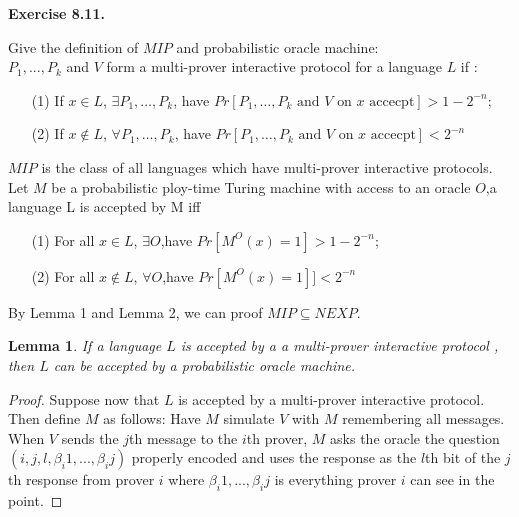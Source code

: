 \documentclass[a4paper]{article}
\newtheorem{lemma}{Lemma}
\newenvironment{exercise}[1]{
	\par
	\noindent\textbf{Exercise #1.}\quad
}{
	\par
	\bigskip
}
\begin{document}

    \begin{exercise}{8.11}
		Give the definition of $MIP$ and probabilistic oracle machine:\\
		
		$P_1,...,P_k$ and $V$ form a multi-prover interactive protocol for a language $L$ if :

		\begin{enumerate}
			\item[(1)] If $x\in L$, $\exists P_1,\ldots,P_k$, have $Pr[\text{$P_1,\ldots,P_k$ and $V$ on $x$ accecpt}]>1-2^{-n}$;
			\item[(2)] If $x\notin L$, $\forall P_1,\ldots,P_k$, have $Pr[\text{$P_1,\ldots,P_k$ and $V$ on $x$ accecpt}]<2^{-n}$
		\end{enumerate}
		
		$MIP$ is the class of all languages which have multi-prover interactive protocols.\\
		
		Let $M$ be a probabilistic ploy-time Turing machine with access to an oracle $O$,a language L is accepted by M iff 

		\begin{enumerate}
			\item[(1)] For all $x\in L$, $\exists O$,have $Pr[M^O(x)=1]>1-2^{-n}$;
			\item[(2)] For all $x\notin L$, $\forall O$,have $Pr[M^O(x)=1]]<2^{-n}$
		\end{enumerate}

		By Lemma 1 and Lemma 2, we can proof $MIP \subseteq NEXP $.\\

		\begin{lemma}
			If a language $L$ is accepted by a  a multi-prover interactive protocol , then $L$ can be accepted by a probabilistic oracle machine.
		\end{lemma}

		\begin{proof}
			Suppose now that $L$ is accepted by a multi-prover interactive protocol. Then define $M$ as follows: Have $M$ simulate $V$ with $M$ remembering all messages. When $V$ sends the $j$th message to the $i$th prover, $M$ asks the oracle the question$(i,j,l,\beta_i1,...,\beta_ij)$ properly encoded and uses the response as the $l$th bit of the $j$th response from prover $i$ where $\beta_i1,...,\beta_ij$ is everything prover $i$ can see in the point.


\end{proof}
\end{exercise}
\end{document}
